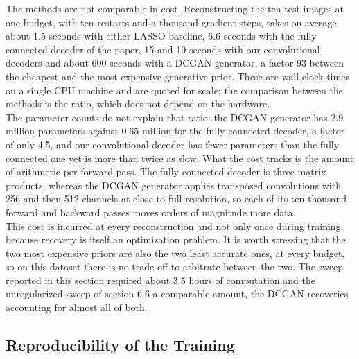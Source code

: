 The methods are not comparable in cost. Reconstructing the ten test images at one budget, with ten restarts and a thousand gradient steps, takes on average about 1.5 seconds with either LASSO baseline, 6.6 seconds with the fully connected decoder of the paper, 15 and 19 seconds with our convolutional decoders and about 600 seconds with a DCGAN generator, a factor 93 between the cheapest and the most expensive generative prior. These are wall-clock times on a single CPU machine and are quoted for scale; the comparison between the methods is the ratio, which does not depend on the hardware.
\\
The parameter counts do not explain that ratio: the DCGAN generator has 2.9 million parameters against 0.65 million for the fully connected decoder, a factor of only 4.5, and our convolutional decoder has fewer parameters than the fully connected one yet is more than twice as slow. What the cost tracks is the amount of arithmetic per forward pass. The fully connected decoder is three matrix products, whereas the DCGAN generator applies transposed convolutions with 256 and then 512 channels at close to full resolution, so each of its ten thousand forward and backward passes moves orders of magnitude more data.
\\
This cost is incurred at every reconstruction and not only once during training, because recovery is itself an optimization problem. It is worth stressing that the two most expensive priors are also the two least accurate ones, at every budget, so on this dataset there is no trade-off to arbitrate between the two. The sweep reported in this section required about 3.5 hours of computation and the unregularized sweep of section 6.6 a comparable amount, the DCGAN recoveries accounting for almost all of both.

\subsection{Reproducibility of the Training}

